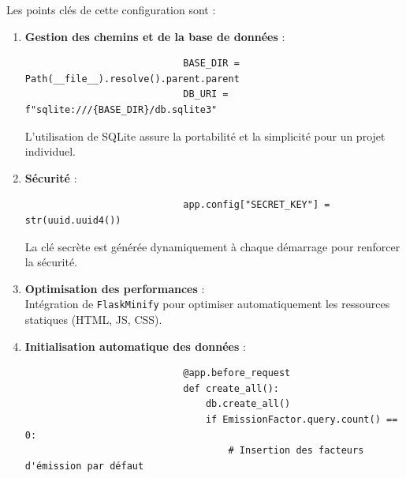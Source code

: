 \documentclass[a4paper,11pt]{article}
\begin{document}
            \noindent Les points clés de cette configuration sont :
            \begin{enumerate}
                \item \textbf{Gestion des chemins et de la base de données} :
                    \begin{tcolorbox}[colback=lightgray!6, colframe=black, left=-45mm, right=5mm, top=2mm, bottom=0mm, boxrule=0.1mm]
                        \begin{verbatim}
                            BASE_DIR = Path(__file__).resolve().parent.parent
                            DB_URI = f"sqlite:///{BASE_DIR}/db.sqlite3"
                        \end{verbatim}
                    \end{tcolorbox}
                    \noindent L'utilisation de SQLite assure la portabilité et la simplicité pour un projet individuel.

                \item \textbf{Sécurité} :
                    \begin{tcolorbox}[colback=lightgray!6, colframe=black, left=-45mm, right=5mm, top=2mm, bottom=0mm, boxrule=0.1mm]
                        \begin{verbatim}
                            app.config["SECRET_KEY"] = str(uuid.uuid4())
                        \end{verbatim}
                    \end{tcolorbox}
                    \noindent La clé secrète est générée dynamiquement à chaque démarrage pour renforcer la sécurité.

                \item \textbf{Optimisation des performances} :\\
                    \noindent Intégration de \texttt{Flask\-Minify} pour optimiser automatiquement les ressources statiques (HTML, JS, CSS).

                \item \textbf{Initialisation automatique des données} :
                    \begin{tcolorbox}[colback=lightgray!6, colframe=black, left=-45mm, right=5mm, top=2mm, bottom=0mm, boxrule=0.1mm]
                        \begin{verbatim}
                            @app.before_request
                            def create_all():
                                db.create_all()
                                if EmissionFactor.query.count() == 0:
                                    # Insertion des facteurs d'émission par défaut
                        \end{verbatim}
                    \end{tcolorbox}


\end{enumerate}
\end{document}
